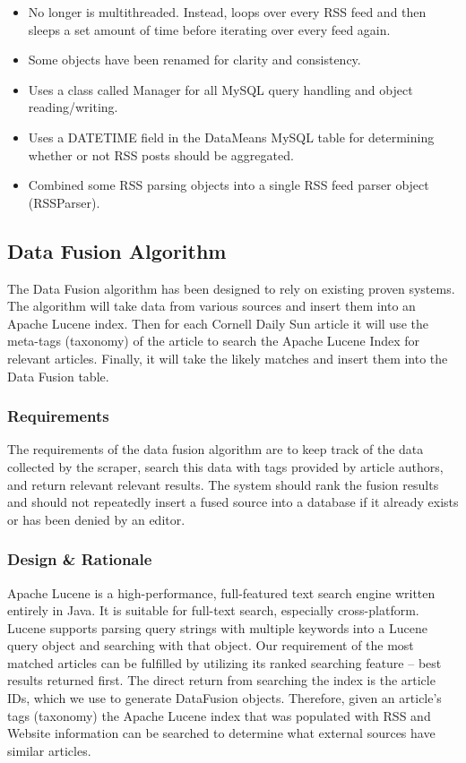 \documentclass[12pt]{article} %
\begin{document}
\begin{itemize}
\item No longer is multithreaded. Instead, loops over every RSS feed and then sleeps a set amount of time before iterating over every feed again.
\item Some objects have been renamed for clarity and consistency.
\item Uses a class called Manager for all MySQL query handling and object reading/writing.
\item Uses a DATETIME field in the DataMeans MySQL table for determining whether or not RSS posts should be aggregated.
\item Combined some RSS parsing objects into a single RSS feed parser object (RSSParser).
\end{itemize}

\subsection{Data Fusion Algorithm}

The Data Fusion algorithm has been designed to rely on existing proven systems. The algorithm will take data from various sources and insert them into an Apache Lucene index. Then for each Cornell Daily Sun article it will use the meta-tags (taxonomy) of the article to search the Apache Lucene Index for relevant articles. Finally, it will take the likely matches and insert them into the Data Fusion table.

\subsubsection{Requirements}

The requirements of the data fusion algorithm are to keep track of the data collected by the scraper, search this data with tags provided by article authors, and return relevant relevant results. The system should rank the fusion results and should not repeatedly insert a fused source into a database if it already exists or has been denied by an editor.

\subsubsection{Design \& Rationale}

Apache Lucene is a high-performance, full-featured text search engine written entirely in Java. It is suitable for full-text search, especially cross-platform. Lucene supports parsing query strings with multiple keywords into a Lucene query object and searching with that object. Our requirement of the most matched articles can be fulfilled by utilizing its ranked searching feature -- best results returned first. The direct return from searching the index is the article IDs, which we use to generate DataFusion objects. Therefore, given an article’s tags (taxonomy) the Apache Lucene index that was populated with RSS and Website information can be searched to determine what external sources have similar articles.
\end{document}

